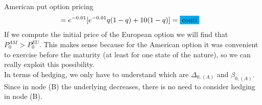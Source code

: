 \begin{example}{American put option pricing}{}{}
\begin{align*}
        &= e^{-0.01}[e^{-0.01}q(1-q)+10(1-q)] = \colorbox{cyan}{conti}
    \end{align*}
    If we compute the initial price of the European option we will find that
    $P^{AM}_{0}>P^{EU}_{0}$. This makes sense because for the American option it was convenient to exercise before the maturity (at least for one state of the nature), so we can really exploit this possibility.\\
    In terms of hedging, we only have to understand which are $\Delta_{0,(A)}$ and $\beta_{0,(A)}$. Since in node (B) the underlying decreases, there is no need to consider hedging in node (B).
\end{example}


